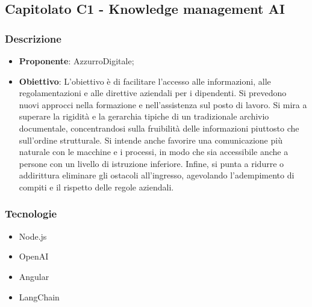 \subsection{Capitolato C1 - Knowledge management AI}


\subsubsection{Descrizione}
\begin{itemize}
    \item \textbf{Proponente}: AzzurroDigitale;
    \item \textbf{Obiettivo}: L'obiettivo è di facilitare l'accesso alle informazioni, alle regolamentazioni e alle direttive aziendali per i dipendenti. Si prevedono nuovi approcci nella formazione e nell'assistenza sul posto di lavoro. Si mira a superare la rigidità e la gerarchia tipiche di un tradizionale archivio documentale, concentrandosi sulla fruibilità delle informazioni piuttosto che sull'ordine strutturale. Si intende anche favorire una comunicazione più naturale con le macchine e i processi, in modo che sia accessibile anche a persone con un livello di istruzione inferiore. Infine, si punta a ridurre o addirittura eliminare gli ostacoli all'ingresso, agevolando l'adempimento di compiti e il rispetto delle regole aziendali.
\end{itemize}


\subsubsection{Tecnologie}
\begin{itemize}
    \item Node.js
    \item OpenAI
    \item Angular
    \item LangChain
\end{itemize}


